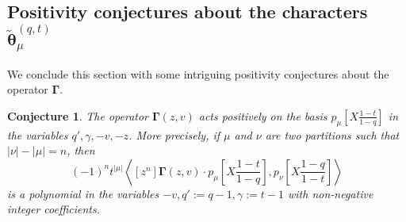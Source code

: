 \documentclass[12pt]{amsart}
\newtheorem{conj}{Conjecture}
\theoremstyle{remark}
\newcommand{\Mch}{\boldsymbol{\widetilde\theta}^{(q,t)}}
\newcommand{\GammaJ}{\boldsymbol{\Gamma}}
\begin{document}
\subsection{Positivity conjectures about the characters \texorpdfstring{$\Mch_\mu$}{}}

We conclude this section with some intriguing positivity conjectures about the operator $\GammaJ$.

\begin{conj}\label{conj Gamma-p}
    The operator $\GammaJ(z,v)$ acts positively on the basis $p_\mu\left[X\frac{1-t}{1-q}\right]$ in the variables $q',\gamma, -v, -z$. More precisely, if $\mu$ and $\nu$ are two partitions such that $|\nu|-|\mu|=n$, then
    $$(-1)^nt^{|\mu|}\left\langle[z^n]\GammaJ(z,v)\cdot p_\mu\left[X\frac{1-t}{1-q}\right],p_\nu\left[X\frac{1-q}{1-t}\right]\right\rangle$$
    is a polynomial in the variables $-v,q':=q-1,\gamma:=t-1$ with non-negative integer coefficients.
\end{conj}
\end{document}
